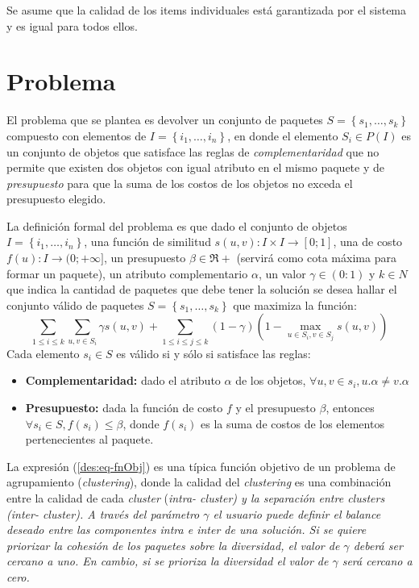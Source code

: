 Se asume que la calidad de los items individuales est\'a garantizada por el sistema y es igual para todos ellos. 

\section{Problema}
El problema que se plantea es devolver un conjunto de paquetes $S = \left\{s_1, \ldots, s_k\right\}$ compuesto con elementos de $I=\left\{i_1,\ldots, i_n\right\}$, en donde el elemento $S_i \in P(I)$ es un conjunto de objetos que satisface las reglas de \textit{complementaridad} que no permite que existen dos objetos con igual atributo en el mismo paquete y de \textit{presupuesto} para que la suma de los costos de los objetos no exceda el presupuesto elegido.

La definición formal del problema es que dado el conjunto de objetos $I=\left\{i_1,\ldots, i_n\right\}$, una función de similitud $s(u,v): I \times I \rightarrow [0;1]$, una de costo $f(u): I \rightarrow (0;+\infty]$, un presupuesto $\beta \in \Re+$ (servirá como cota máxima para formar un paquete), un atributo complementario $\alpha$, un valor $\gamma \in (0:1)$ y $k \in N$ que indica la cantidad de paquetes que debe tener la solución se desea hallar el conjunto válido de paquetes $S = \left\{s_1, \ldots, s_k\right\}$ que maximiza la función:
\begin{equation} \label{des:eq-fnObj}
\sum_{1 \leq i \leq k}{\sum_{u,v \in S_i}{\gamma s(u,v)}} + \sum_{1 \leq i \leq j \leq k}{(1-\gamma) (1-\max_{u \in S_i, v \in S_j}{s(u,v)})}
\end{equation}
Cada elemento $s_i \in S$ es válido si y sólo si satisface las reglas:
\begin{itemize}
	\item \textbf{Complementaridad:} dado el atributo $\alpha$ de los objetos, $\forall u,v \in s_i, u.\alpha \neq v.\alpha$
	\item \textbf{Presupuesto:} dada la función de costo $f$ y el presupuesto $\beta$, entonces $\forall s_i \in S, f(s_i) \leq \beta$, donde $f(s_i)$ es la suma de costos de los elementos pertenecientes al paquete.
\end{itemize}		  


La expresi\'on (\ref{des:eq-fnObj}) es una t\'ipica funci\'on objetivo de un problema de agrupamiento ({\em clustering}), donde la calidad del {\em clustering} es una combinaci\'on entre la calidad de cada {\em cluster} (\em{intra}- cluster) y la separaci\'on entre {\em clusters} (\em{inter}- cluster). A trav\'es del par\'ametro $\gamma$ el usuario puede definir el balance deseado entre las componentes intra e inter de una soluci\'on. Si se quiere priorizar la cohesi\'on de los paquetes sobre la diversidad, el  valor de $\gamma$ deber\'a ser cercano a uno. En cambio, si se prioriza la diversidad el valor de $\gamma$ ser\'a cercano a cero.

